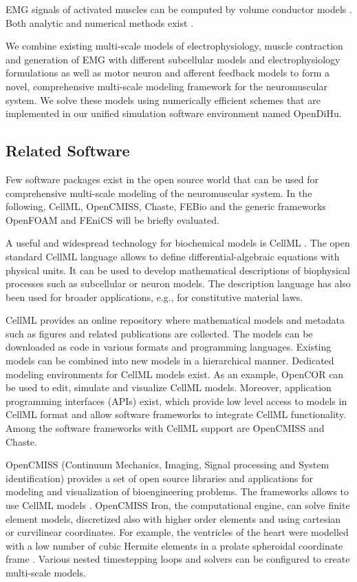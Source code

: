 EMG signals of activated muscles can be computed by volume conductor models \cite{Mesin2013}. Both 
 analytic \cite{Dimitrov1998, Farina2001, Mesin2006} and numerical methods exist \cite{Lowery2002, Mordhorst2015, Mordhorst2017, Klotz2020}.

We combine existing multi-scale models of electrophysiology, muscle contraction and generation of EMG with different subcellular models and electrophysiology formulations as well as motor neuron and afferent feedback models to form a novel, comprehensive multi-scale modeling framework for the neuromuscular system. We solve these models using numerically efficient schemes that are implemented in our unified simulation software environment named OpenDiHu.
 
\subsection{Related Software}\label{sec:intro_related_software}
Few software packages exist in the open source world that can be used for comprehensive multi-scale modeling of the neuromuscular system. In the following, CellML, OpenCMISS, Chaste, FEBio and the generic frameworks OpenFOAM and FEniCS will be briefly evaluated.

A useful and widespread technology for biochemical models is CellML \cite{Cellml2003,Lloyd2004}. The open standard CellML language allows to define differential-algebraic equations with physical units. It can be used to develop mathematical descriptions of biophysical processes such as subcellular or neuron models. The description language has also been used for broader applications, e.g., for constitutive material laws. 

CellML provides an online repository where mathematical models and metadata such as figures and related publications are collected. The models can be downloaded as code in various formats and programming languages. Existing models can be combined into new models in a hierarchical manner. Dedicated modeling environments for CellML models exist. As an example, OpenCOR \cite{OpenCOR2015} can be used to edit, simulate and visualize CellML models. Moreover, application programming interfaces (APIs) exist, which provide low level access to models in CellML format and allow software frameworks to integrate CellML functionality.
Among the software frameworks with CellML support are OpenCMISS and Chaste.

OpenCMISS (Continuum Mechanics, Imaging, Signal processing and System identification) \cite{Bradley2011} provides a set of open source libraries and applications for modeling and visualization of bioengineering problems. The frameworks allows to use CellML models \cite{Nickerson2014}.
OpenCMISS Iron, the computational engine, can solve finite element models, discretized also with higher order elements and using cartesian or curvilinear coordinates. For example, the ventricles of the heart were modelled with a low number of cubic Hermite elements in a prolate spheroidal coordinate frame \cite{smith2004multiscale}.
Various nested timestepping loops and solvers can be configured to create multi-scale models. 

